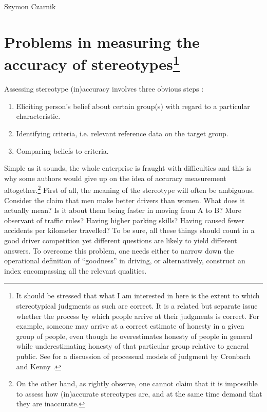 \begin{artengenv}{Szymon Czarnik}
\enlargethispage{.5\baselineskip}
\section[Problems in measuring the accuracy of stereotypes]{Problems in measuring the accuracy of stereotypes\footnote{It should be stressed that what I am interested in here is the extent to which stereotypical judgments as such are correct. It is a related but separate issue whether the process by which people arrive at their judgments is correct. For example, someone may arrive at a correct estimate of honesty in a given group of people, even though he overestimates honesty of people in general while underestimating honesty of that particular group relative to general public. See
\parencite[][]{jussim_stereotype_2016} %
 for a discussion of processual models of judgment by Cronbach 
\parencite*[][]{cronbach_processes_1955} %
 and Kenny 
\parencite[][]{kenny_interpersonal_1994}. %
 }}
Assessing stereotype (in)accuracy involves three obvious steps
\parencite[][]{jussim_stereotype_2015}:%


\begin{enumerate}
\item Eliciting person's belief about certain group(s) with regard to a particular characteristic.
\item Identifying criteria, i.e. relevant reference data on the target group.
\item Comparing beliefs to criteria.
\end{enumerate}
Simple as it sounds, the whole enterprise is fraught with difficulties and this is why some authors would give up on the idea of accuracy measurement altogether.\footnote{On the other hand, as
\parencite[][]{jussim_stereotype_2016} %
 rightly observe, one cannot claim that it is impossible to assess how (in)accurate stereotypes are, and at the same time demand that they are inaccurate.} First of all, the meaning of the stereotype will often be ambiguous. Consider the claim that men make better drivers than women. What does it actually mean? Is it about them being faster in moving from A to B? More observant of traffic rules? Having higher parking skills? Having caused fewer accidents per kilometer travelled? To be sure, all these things should count in a good driver competition yet different questions are likely to yield different answers. To overcome this problem, one needs either to narrow down the operational definition of ``goodness'' in driving, or alternatively, construct an index encompassing all the relevant qualities.


\end{artengenv}
